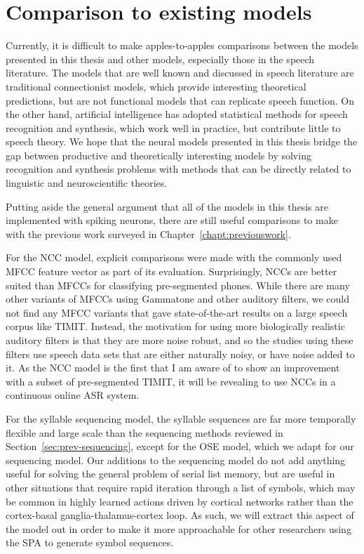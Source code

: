 \section{Comparison to existing models}

Currently, it is difficult to make
apples-to-apples comparisons between
the models presented in this thesis
and other models,
especially those in the speech literature.
The models that are well known and discussed
in speech literature are traditional
connectionist models,
which provide interesting theoretical predictions,
but are not functional models
that can replicate speech function.
On the other hand, artificial intelligence
has adopted statistical methods
for speech recognition and synthesis,
which work well in practice,
but contribute little
to speech theory.
We hope that the neural models presented
in this thesis bridge the gap
between productive and theoretically interesting models
by solving recognition and synthesis problems
with methods that can be directly related
to linguistic and neuroscientific theories.

Putting aside the general argument
that all of the models in this thesis
are implemented with spiking neurons,
there are still useful comparisons
to make with the previous work
surveyed in Chapter~\ref{chapt:previouswork}.

For the NCC model, explicit comparisons were made
with the commonly used MFCC feature vector
as part of its evaluation.
Surprisingly, NCCs
are better suited than MFCCs
for classifying pre-segmented phones.
While there are many other variants of
MFCCs using Gammatone and other auditory filters,
we could not find any MFCC variants
that gave state-of-the-art results on
a large speech corpus like TIMIT.
Instead, the motivation for using
more biologically realistic
auditory filters is that
they are more noise robust,
and so the studies using these filters
use speech data sets that are either naturally noisy,
or have noise added to it.
As the NCC model is the first
that I am aware of to show
an improvement with
a subset of pre-segmented TIMIT,
it will be revealing
to use NCCs in a
continuous online ASR system.

For the syllable sequencing model,
the syllable sequences
are far more temporally flexible
and large scale than the sequencing methods
reviewed in Section~\ref{sec:prev-sequencing},
except for the OSE model,
which we adapt for our sequencing model.
Our additions to the sequencing model
do not add anything useful for
solving the general problem
of serial list memory,
but are useful in other situations
that require rapid iteration
through a list of symbols,
which may be common
in highly learned actions
driven by cortical networks
rather than the
cortex-basal ganglia-thalamus-cortex loop.
As such, we will extract
this aspect of the model out
in order to make it more approachable
for other researchers using the SPA
to generate symbol sequences.

